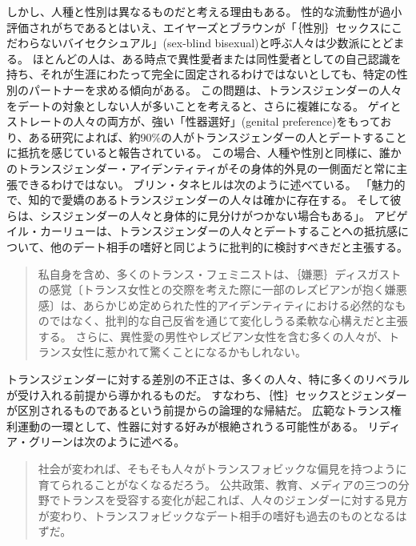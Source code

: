 \documentclass[paper=a4,book,openany]{jlreq}
\newcommand{\ig}[1]{}           %
\begin{document}
しかし、人種と性別は異なるものだと考える理由もある。
性的な流動性が過小評価されがちであるとはいえ、エイヤーズとブラウンが「｛性別｝{セックス}にこだわらないバイセクシュアル」(sex-blind bisexual)と呼ぶ人々は少数派にとどまる。
ほとんどの人は、ある時点で異性愛者または同性愛者としての自己認識を持ち、それが生涯にわたって完全に固定されるわけではないとしても、特定の性別のパートナーを求める傾向がある。
この問題は、トランスジェンダーの人々をデートの対象としない人が多いことを考えると、さらに複雑になる。
ゲイとストレートの人々の両方が、強い「性器選好」(genital preference)をもっており、ある研究によれば、約90\%の人がトランスジェンダーの人とデートすることに抵抗を感じていると報告されている\citep{blair19:_trans_exclus_world_datin}。
この場合、人種や性別と同様に、誰かのトランスジェンダー・アイデンティティがその身体的外見の一側面だと常に主張できるわけではない。
ブリン・タネヒルは次のように述べている。
「魅力的で、知的で愛嬌のあるトランスジェンダーの人々は確かに存在する。
そして彼らは、シスジェンダーの人々と身体的に見分けがつかない場合もある」\citep{tannehill19:_is_refus_date}。
アビゲイル・カーリューは、トランスジェンダーの人々とデートすることへの抵抗感について、他のデート相手の嗜好と同じように批判的に検討すべきだと主張する。

\begin{quote}
私自身を含め、多くのトランス・フェミニストは、｛嫌悪｝{ディスガスト}の感覚〔トランス女性との交際を考えた際に一部のレズビアンが抱く嫌悪感〕は、あらかじめ定められた性的アイデンティティにおける必然的なものではなく、批判的な自己反省を通じて変化しうる柔軟な心構えだと主張する。
さらに、異性愛の男性やレズビアン女性を含む多くの人々が、トランス女性に惹かれて驚くことになるかもしれない。
\citep{curlew18:_whats_wrong_no}
\end{quote}

トランスジェンダーに対する差別の不正さは、多くの人々、特に多くのリベラルが受け入れる前提から導かれるものだ。
すなわち、｛性｝{セックス}とジェンダーが区別されるものであるという前提からの論理的な帰結だ。
広範なトランス権利運動の一環として、性器に対する好みが根絶されうる可能性がある。
リディア・グリーン\ig{Lydia Green}は次のように述べる。

\begin{quote}
  社会が変われば、そもそも人々がトランスフォビックな偏見を持つように育てられることがなくなるだろう。
公共政策、教育、メディアの三つの分野でトランスを受容する変化が起これば、人々のジェンダーに対する見方が変わり、トランスフォビックなデート相手の嗜好も過去のものとなるはずだ。
\citep{green17:_to_be_effec}
\end{quote}
\end{document}
